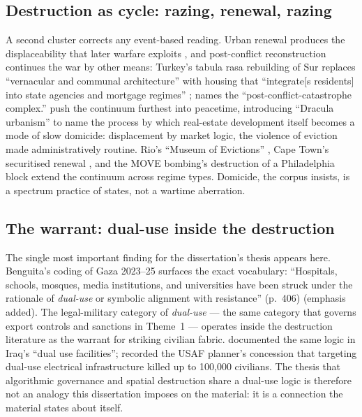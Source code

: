 \subsection{Destruction as cycle: razing, renewal, razing}

A second cluster corrects any event-based reading. Urban renewal produces the displaceability that later warfare exploits \parencite{genc2021,coyles2017}, and post-conflict reconstruction continues the war by other means: Turkey's tabula rasa rebuilding of Sur replaces ``vernacular and communal architecture'' with housing that ``integrate[s residents] into state agencies and mortgage regimes'' \parencite[p.~16]{smith2022}; \textcite[p.~2]{hourani2024} names the ``post-conflict-catastrophe complex.'' \textcite[p.~2]{wilson2026} push the continuum furthest into peacetime, introducing ``Dracula urbanism'' to name the process by which real-estate development itself becomes a mode of slow domicide: displacement by market logic, the violence of eviction made administratively routine. Rio's ``Museum of Evictions'' \parencite[p.~387]{arantes2022}, Cape Town's securitised renewal \parencite{samara2010}, and the MOVE bombing's destruction of a Philadelphia block \parencite{massaro2015} extend the continuum across regime types. Domicide, the corpus insists, is a spectrum practice of states, not a wartime aberration.

\subsection{The warrant: dual-use inside the destruction}

The single most important finding for the dissertation's thesis appears here. Benguita's \citeyearpar{benguita2025} coding of Gaza 2023–25 surfaces the exact vocabulary: ``Hospitals, schools, mosques, media institutions, and universities have been struck under the rationale of \textit{dual-use} or symbolic alignment with resistance'' (p.~406) (emphasis added). The legal-military category of \textit{dual-use} — the same category that governs export controls and sanctions in Theme~1 — operates inside the destruction literature as the warrant for striking civilian fabric. \textcite[p.~406]{coward2009} documented the same logic in Iraq's ``dual use facilities''; \textcite[p.~355]{graham2011} recorded the USAF planner's concession that targeting dual-use electrical infrastructure killed up to 100,000 civilians. The thesis that algorithmic governance and spatial destruction share a dual-use logic is therefore not an analogy this dissertation imposes on the material: it is a connection the material states about itself.

